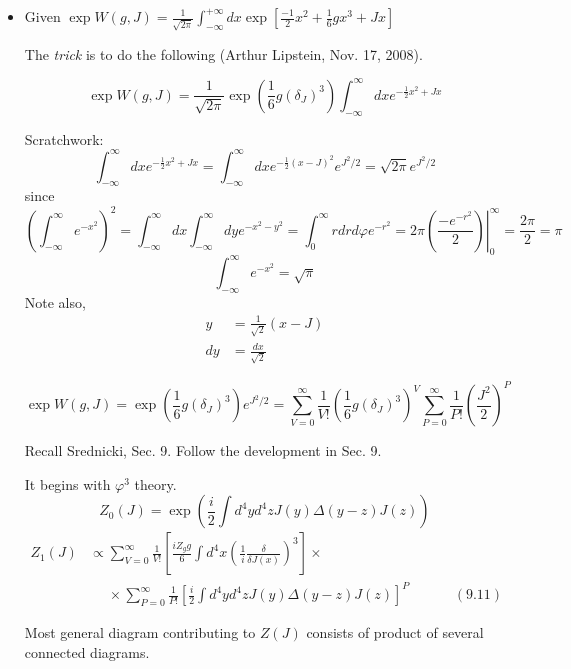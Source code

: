 \documentclass[twoside]{amsart}
\newcommand{\solutionhead}[1]
  {\smallskip
   \noindent{\large\bf Solution #1.}
   }
\begin{document}
\solutionhead{9.4} 
\begin{itemize}
\item[(a)] Given $\exp{ W(g,J)} = \frac{1}{\sqrt{2 \pi }} \int_{-\infty}^{+\infty} dx \exp{ \left[ \frac{-1}{2} x^2 + \frac{1}{6} gx^3 + Jx \right] }$  

The \emph{trick} is to do the following (Arthur Lipstein, Nov. 17, 2008).

\[
\boxed{
\exp{ W(g,J)} = \frac{1}{\sqrt{2\pi}} \exp{ \left( \frac{1}{6} g \left( \delta_J\right)^3 \right) } \int_{-\infty}^{\infty} dx e^{ -\frac{1}{2} x^2 + Jx } }
\] 

\small

Scratchwork:
\[
\int_{-\infty}^{\infty} dx e^{ - \frac{1}{2} x^2 + Jx } = \int_{-\infty}^{\infty} dx e^{ - \frac{1}{2} (x-J)^2 } e^{J^2/2} = \sqrt{ 2 \pi } e^{J^2/2}
\]
since 
\[
\left( \int_{-\infty}^{\infty} e^{-x^2} \right)^2 = \int_{-\infty}^{\infty} dx \int_{-\infty}^{\infty} dy e^{ - x^2 - y^2 } = \int_0^{\infty} r dr d\varphi e^{-r^2 } = 2\pi \left. \left( \frac{ -e^{-r^2} }{2} \right) \right|_0^{\infty} = \frac{ 2 \pi }{2} = \pi 
\]
\[
\int_{-\infty}^{\infty} e^{-x^2 } = \sqrt{ \pi }
\]
Note also, 
\[
\begin{aligned} y & = \frac{1}{\sqrt{2} } ( x- J)  \\ dy & = \frac{dx}{ \sqrt{2}} \end{aligned}
\]

\normalsize
\[
\exp{ W(g,J)} = \exp{ \left( \frac{1}{6} g(\delta_J)^3 \right) } e^{J^2/2 } = \sum_{V=0}^{\infty} \frac{1}{V!} \left( \frac{1}{6} g(\delta_J)^3 \right)^V \sum_{P=0}^{\infty} \frac{1}{P!} \left( \frac{J^2}{2} \right)^P
\]

\hrulefill

Recall Srednicki, Sec. 9.  Follow the development in Sec. 9.  

It begins with $\varphi^3$ theory.  
\[
Z_0(J) = \exp{ \left( \frac{i}{2} \int d^4y d^4z J(y) \Delta(y-z) J(z) \right) }
\]
\[
\begin{aligned}
  Z_1(J) & \propto \sum_{V=0}^{\infty} \frac{1}{V!} \left[ \frac{ i Z_g g}{6} \int d^4x \left( \frac{1}{i} \frac{ \delta}{ \delta J(x)} \right)^3 \right] \times \\ 
  & \phantom{ \propto } \times \sum_{P=0}^{\infty} \frac{1}{P!} \left[ \frac{ i}{2} \int d^4y d^4z J(y) \Delta(y-z) J(z) \right]^P  \quad \quad \quad \, (9.11) 
\end{aligned}
\]

Most general diagram contributing to $Z(J)$ consists of product of several connected diagrams.  


\end{itemize}
\end{document}
